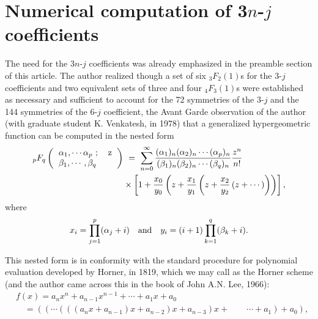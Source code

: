 \section*{Numerical computation of 3$n$-$j$ coefficients}

The need for the 3$n$-$j$ coefficients was already emphasized in the preamble section of this 
article. The author realized though a set of six $_3F_2(1)$s for the 3-$j$ coefficients and two 
equivalent sets of three and four $_4F_3(1)$s were established as necessary and sufficient to 
account for the 72 symmetries of the 3-$j$ and the 144 symmetries of the 6-$j$ coefficient, the 
Avant Garde observation of the author (with graduate student K. Venkatesh, in 1978) that a generalized
hypergeometric function can be computed in the nested form
\begin{equation}
\begin{split}
{}_pF_q
\left( 
\begin{tabular}{lr} 
$\alpha_1,\cdots \alpha_p\ ;$ & z\\
$\beta_1,\cdots, \beta_q $& \\ 
\end{tabular} 
\right) & \ =\ \sum_{n=0}^\infty 
\frac{(\alpha_1)_n (\alpha_2)_n \cdots (\alpha_p)_n}{(\beta_1)_n (\beta_2)_n \cdots (\beta_q)_n}
\frac{z^n}{n!}\\
& \times \left[ 1 + \frac{x_0}{y_0}\left(z + \frac{x_1}{y_1}\left( z + \frac{x_2}{y_2}\left(z + \cdots 
\right) \right) \right) \right], \label{chap29-eq59}
\end{split}
\end{equation}
where
\begin{equation}
x_i=\prod_{j=1}^p (\alpha_j + i)\quad {\rm and}\quad y_i= (i+1)\prod_{k=1}^q (\beta_k + i).\label{chap29-eq60}
\end{equation}

This nested form is in conformity with the standard procedure for polynomial evaluation 
developed by Horner, in 1819, which we may call as the Horner scheme (and the author 
came across this in the book of John A.N. Lee, 1966):
\begin{equation}
\begin{split}
& f(x) = a_nx^n + a_{n-1}x^{n-1} + \cdots + a_1x + a_0 \\
& \quad = ((\cdots (((a_nx+ a_{n-1})x + a_{n-2})x + a_{n-3})x + \qquad \cdots + a_1) + a_0), \label{chap29-eq61}
\end{split}
\end{equation}

